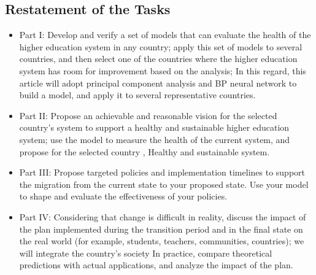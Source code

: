 \documentclass[12pt]{article}  %
\begin{document}
\subsection{Restatement of the Tasks}


\begin{itemize}
   
   

 \item Part I: Develop and verify a set of models that can evaluate the health of the higher education system in any country; apply this set of models to several countries, and then select one of the countries where the higher education system has room for improvement based on the analysis; In this regard, this article will adopt principal component analysis and BP neural network to build a model, and apply it to several representative countries.

\item Part II: Propose an achievable and reasonable vision for the selected country’s system to support a healthy and sustainable higher education system; use the model to measure the health of the current system, and propose for the selected country , Healthy and sustainable system.

\item Part III: Propose targeted policies and implementation timelines to support the migration from the current state to your proposed state. Use your model to shape and evaluate the effectiveness of your policies.

\item Part IV: Considering that change is difficult in reality, discuss the impact of the plan implemented during the transition period and in the final state on the real world (for example, students, teachers, communities, countries); we will integrate the country’s society In practice, compare theoretical predictions with actual applications, and analyze the impact of the plan.

\end{itemize}
\end{document}
